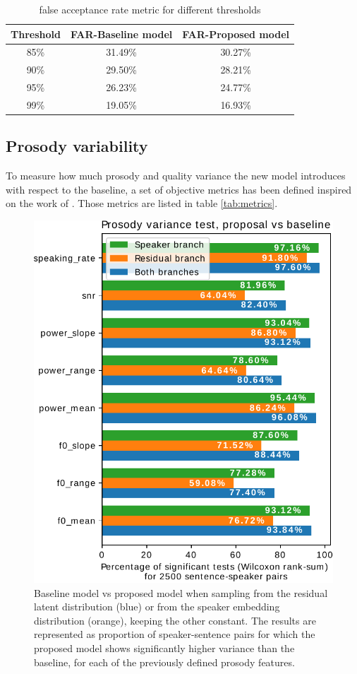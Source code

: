 \begin{table}[h]
	\centering
	\caption{false acceptance rate metric for different thresholds}
	\footnotesize
	\begin{tabular}{ccc}
		\toprule
		\textbf{Threshold} & \textbf{FAR-Baseline model} & \textbf{FAR-Proposed model} \\
		\midrule
		85\% & 31.49\% & 30.27\% \\

		90\% & 29.50\% & 28.21\% \\

		95\% & 26.23\% & 24.77\% \\

		99\% & 19.05\% & 16.93\% \\
		\bottomrule
	\end{tabular}
	\label{tab:far}
\end{table}



\subsection{Prosody variability}
To measure how much prosody and quality variance the new model introduces with respect to the baseline, a set of objective metrics has been defined inspired on the work of \autocite{Raitio2020}. Those metrics are listed in table \ref{tab:metrics}.

\begin{figure}[h!]
	\centering
	\includegraphics[width=0.7\linewidth]{tts/images/wilcoxon}
	\caption{Baseline model vs proposed model when sampling from the residual latent distribution (blue) or from the speaker embedding distribution (orange), keeping the other constant. The results are represented as proportion of speaker-sentence pairs for which the proposed model shows significantly higher variance than the baseline, for each of the previously defined prosody features.}
	\label{fig:wilcoxon}
\end{figure}


